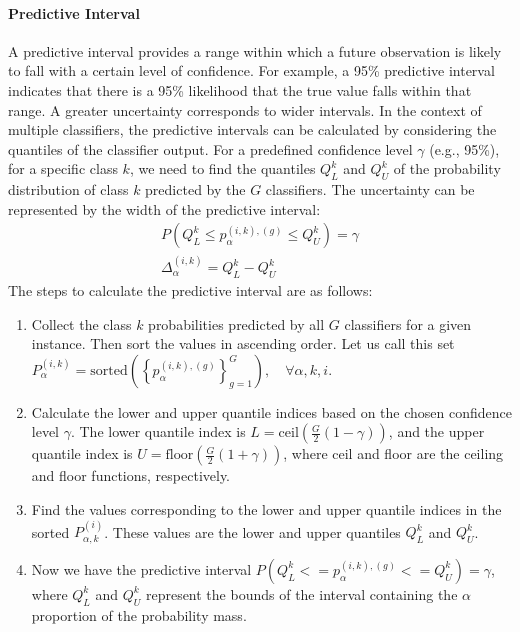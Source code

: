 \paragraph{Predictive Interval}%
A predictive interval provides a range within which a future observation is likely to fall with a certain level of confidence. For example, a 95\% predictive interval indicates that there is a 95\% likelihood that the true value falls within that range. A greater uncertainty corresponds to wider intervals. In the context of multiple classifiers, the predictive intervals can be calculated by considering the quantiles of the classifier output. For a predefined confidence level $\gamma $ (e.g., 95\%), for a specific class $k $, we need to find the quantiles $Q_{L}^{k} $ and $Q_{U}^{k} $ of the probability distribution of class $k $ predicted by the $G $ classifiers. The uncertainty can be represented by the width of the predictive interval:
\begin{equation}
    \begin{aligned}
        P\left(Q_L^{k} \leq p_{\alpha}^{(i,k),(g)} \leq Q_U^{k}\right) = \gamma
        \\
        \Delta_{\alpha}^{(i,k)} = Q_L^{k} - Q_U^{k}
    \end{aligned}
    \label{eq:crowd.Eq.uncertainty}
\end{equation}
The steps to calculate the predictive interval are as follows:
\begin{enumerate}
    \item Collect the class $k $ probabilities predicted by all $G$ classifiers for a given instance. Then sort the values in ascending order. Let us call this set $P_{\alpha}^{(i,k)}=\mathrm{sorted}\left({\left\{p_{\alpha}^{(i,k),(g)}\right\}}_{g=1}^G\right),\quad\forall \alpha,k,i $.
    \item Calculate the lower and upper quantile indices based on the chosen confidence level $\gamma $. The lower quantile index is $L=\mathrm{ceil}\left(\frac{G}{2}\left(1-\gamma\right)\right) $, and the upper quantile index is $U=\mathrm{floor}\left(\frac{G}{2} (1+\gamma)\right) $, where ceil and floor are the ceiling and floor functions, respectively.
    \item Find the values corresponding to the lower and upper quantile indices in the sorted $P_{\alpha,k}^{(i)} $. These values are the lower and upper quantiles $Q_L^{k} $ and $Q_U^{k} $.
    \item Now we have the predictive interval $P\left(Q_L^{k}<=p_{\alpha}^{(i,k),(g)}<=Q_U^{k}\right)=\gamma $, where $Q_L^{k} $ and $Q_U^{k} $ represent the bounds of the interval containing the $\alpha$ proportion of the probability mass.
\end{enumerate}
%
